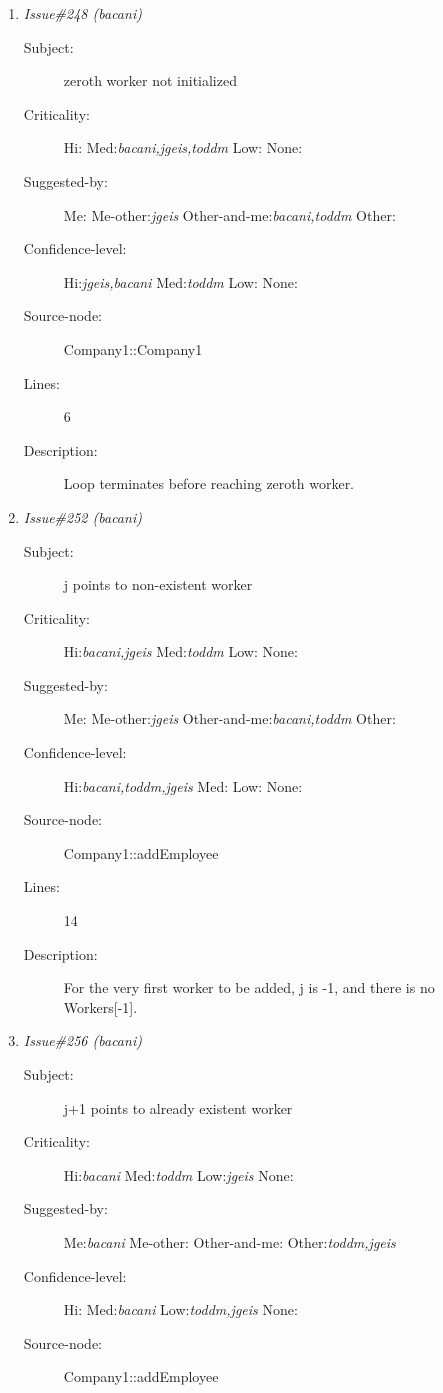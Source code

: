 \begin{enumerate}
\begin{description}
\item [Lines:] 4

\item [Description:] Excludes zero as a valid value. Zero is
actually valid.
\end{description}
\item {\it Issue\#248 (bacani)}
\begin{description}
\item [Subject:] zeroth worker not initialized
\item [Criticality:] Hi:{\it } Med:{\it bacani,jgeis,toddm} Low:{\it } None:{\it }
\item [Suggested-by:] Me:{\it } Me-other:{\it jgeis} Other-and-me:{\it bacani,toddm} Other:{\it }
\item [Confidence-level:] Hi:{\it jgeis,bacani} Med:{\it toddm} Low:{\it } None:{\it }
\item [Source-node:] Company1::Company1

\item [Lines:] 6

\item [Description:] Loop terminates before reaching zeroth worker.
\end{description}
\item {\it Issue\#252 (bacani)}
\begin{description}
\item [Subject:] j points to non-existent worker
\item [Criticality:] Hi:{\it bacani,jgeis} Med:{\it toddm} Low:{\it } None:{\it }
\item [Suggested-by:] Me:{\it } Me-other:{\it jgeis} Other-and-me:{\it bacani,toddm} Other:{\it }
\item [Confidence-level:] Hi:{\it bacani,toddm,jgeis} Med:{\it } Low:{\it } None:{\it }
\item [Source-node:] Company1::addEmployee

\item [Lines:] 14

\item [Description:] For the very first worker to be added, j is
-1, and there is no Workers[-1].
\end{description}
\item {\it Issue\#256 (bacani)}
\begin{description}
\item [Subject:] j+1 points to already existent worker
\item [Criticality:] Hi:{\it bacani} Med:{\it toddm} Low:{\it jgeis} None:{\it }
\item [Suggested-by:] Me:{\it bacani} Me-other:{\it } Other-and-me:{\it } Other:{\it toddm,jgeis}
\item [Confidence-level:] Hi:{\it } Med:{\it bacani} Low:{\it toddm,jgeis} None:{\it }
\item [Source-node:] Company1::addEmployee


\end{description}
\end{enumerate}

